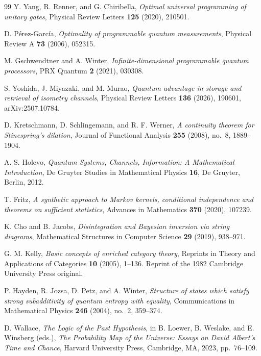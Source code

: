\documentclass[11pt]{article}
\begin{document}
\begin{thebibliography}{99}
Y. Yang, R. Renner, and G. Chiribella, \emph{Optimal universal programming of
unitary gates}, Physical Review Letters \textbf{125} (2020), 210501.

D. P\'erez-Garc\'ia, \emph{Optimality of programmable quantum measurements},
Physical Review A \textbf{73} (2006), 052315.

M. Gschwendtner and A. Winter, \emph{Infinite-dimensional programmable quantum
processors}, PRX Quantum \textbf{2} (2021), 030308.

S. Yoshida, J. Miyazaki, and M. Murao, \emph{Quantum advantage in storage and
retrieval of isometry channels}, Physical Review Letters \textbf{136} (2026),
190601, arXiv:2507.10784.

D. Kretschmann, D. Schlingemann, and R. F. Werner, \emph{A continuity theorem
for Stinespring's dilation}, Journal of Functional Analysis \textbf{255} (2008),
no.~8, 1889--1904.

A. S. Holevo, \emph{Quantum Systems, Channels, Information: A Mathematical
Introduction}, De Gruyter Studies in Mathematical Physics \textbf{16}, De
Gruyter, Berlin, 2012.

T. Fritz, \emph{A synthetic approach to Markov kernels, conditional independence
and theorems on sufficient statistics}, Advances in Mathematics \textbf{370}
(2020), 107239.

K. Cho and B. Jacobs, \emph{Disintegration and Bayesian inversion via string
diagrams}, Mathematical Structures in Computer Science \textbf{29} (2019),
938--971.

G. M. Kelly, \emph{Basic concepts of enriched category theory}, Reprints in
Theory and Applications of Categories \textbf{10} (2005), 1--136. Reprint of the
1982 Cambridge University Press original.

P. Hayden, R. Jozsa, D. Petz, and A. Winter, \emph{Structure of states
which satisfy strong subadditivity of quantum entropy with equality},
Communications in Mathematical Physics \textbf{246} (2004), no.~2,
359--374.

D. Wallace, \emph{The Logic of the Past Hypothesis}, in B. Loewer, B.
Weslake, and E. Winsberg (eds.), \emph{The Probability Map of the Universe:
Essays on David Albert's Time and Chance}, Harvard University Press,
Cambridge, MA, 2023, pp.~76--109.


\end{thebibliography}
\end{document}
